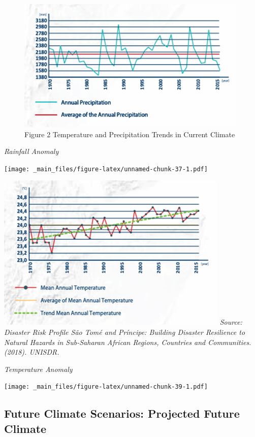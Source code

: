 \documentclass[
]{book}
\begin{document}
\begin{figure}
\centering
\includegraphics{images/pr_trends.png}
\caption{Figure 2 Temperature and Precipitation Trends in Current Climate}
\end{figure}

\emph{Rainfall Anomaly}

\texttt{[image: \_main\_files/figure-latex/unnamed-chunk-37-1.pdf]}

\includegraphics{images/temp_trends.png}
\emph{Source: Disaster Risk Profile São Tomé and Príncipe: Building Disaster Resilience to Natural Hazards in Sub-Saharan African Regions, Countries and Communities. (2018). UNISDR.}

\emph{Temperature Anomaly}

\texttt{[image: \_main\_files/figure-latex/unnamed-chunk-39-1.pdf]}

\hypertarget{future-climate-scenarios-projected-future-climate-1}{%
\subsection{Future Climate Scenarios: Projected Future Climate}\label{future-climate-scenarios-projected-future-climate-1}}
\end{document}
